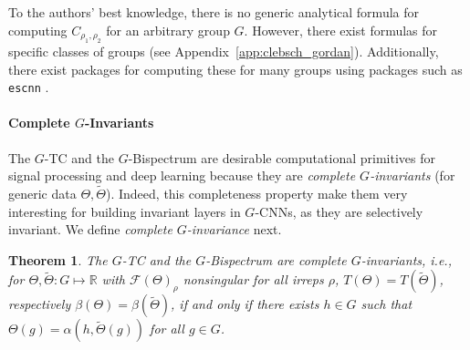 \documentclass{article}
\theoremstyle{plain}
\newtheorem{theorem}{Theorem}[section]
\theoremstyle{definition}
\theoremstyle{remark}
\begin{document}
To the authors' best knowledge, there is no generic analytical formula for computing $C_{\rho_1,\rho_2}$ for an arbitrary group $G$. However, there exist formulas for specific classes of groups (see Appendix~\ref{app:clebsch_gordan}). Additionally, there exist packages for computing these for many groups using packages such as \texttt{escnn} \citep{cesa2022a}.

\paragraph{Complete $G$-Invariants} The $G$-TC and the $G$-Bispectrum are desirable computational primitives for signal processing and deep learning because they are \textit{complete $G$-invariants} (for generic data $\Theta, \widetilde{\Theta}$). Indeed, this completeness property make them very interesting for building invariant layers in $G$-CNNs, as they are selectively invariant. We define \textit{complete $G$-invariance} next.
\begin{theorem}{\citep[Thm.3.2] {Kakarala2009CompletenessOB}}
    \label{thm:bsp_invariance}
    The $G$-TC and the $G$-Bispectrum are complete $G$-invariants, i.e., for $\Theta, \widetilde{\Theta}:G\mapsto\mathbb{R}$ with $\mathcal{F}(\Theta)_\rho$ nonsingular for all irreps $\rho$, $T(\Theta)=T(\widetilde{\Theta})$, respectively  $\beta(\Theta) = \beta(\widetilde{\Theta})$, if and only if there exists $h\in G$ such that $\Theta(g) = \alpha(h, \widetilde{\Theta}(g))$ for all $g\in G$.
\end{theorem}
\end{document}
